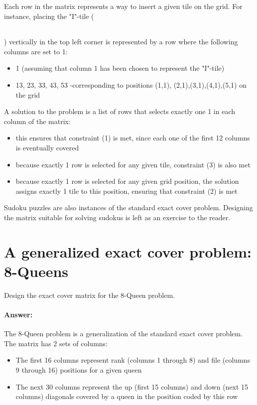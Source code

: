 \documentclass[table]{article}
\begin{document}
Each row in the matrix represents a way to insert a given tile on the grid. For instance, placing the "I"-tile ({\footnotesize \begin{tabular}{|c|c|c|c|c|}\hline\hspace{1em}&\hspace{1em}&\hspace{1em}&\hspace{1em}&\hspace{1em}\\\hline\end{tabular}}) vertically in the top left corner is represented by a row where the following columns are set to 1:
\begin{itemize}
	\item 1 (assuming that column 1 has been chosen to represent the "I"-tile)
	\item 13, 23, 33, 43, 53 -corresponding to positions (1,1), (2,1),(3,1),(4,1),(5,1) on the grid
\end{itemize}

A solution to the problem is a list of rows that selects exactly one 1 in each column of the matrix:
	\begin{itemize}
	\item this ensures that constraint (1) is met, since each one of the first 12 columns is eventually covered
	\item because exactly 1 row is selected for any given tile, constraint (3) is also met
	\item because exactly 1 row is selected for any given grid position, the solution assigns exactly 1 tile to this position, ensuring that constraint (2) is met
	\end{itemize}


Sudoku puzzles are also instances of the standard exact cover problem. Designing the matrix suitable for solving sudokus is left as an exercise to the reader.

\section{A generalized exact cover problem: 8-Queens}

Design the exact cover matrix for the 8-Queen problem.

\paragraph{Answer:} The 8-Queen problem is a generalization of the standard exact cover problem. The matrix has 2 sets of columns:
\begin{itemize}
\item The first 16 columns represent rank (columns 1 through 8)  and file (columns 9 through 16) positions for a given queen
\item The next 30 columns represent the up (first 15 columns) and down (next 15 columns) diagonals covered by a queen in the position coded by this row
\end{itemize}
\end{document}
